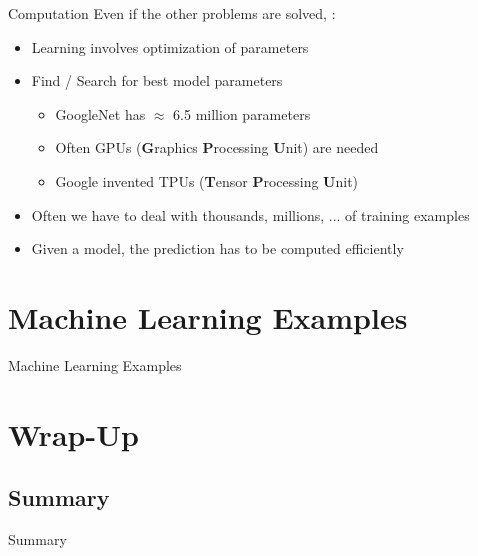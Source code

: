 \begin{frame}{Computation}{}
	Even if the other problems are solved, :
	\begin{itemize}
		\item Learning involves optimization of parameters
		\item Find / Search for best model parameters
		\begin{itemize}
			\item GoogleNet has $\approx$ 6.5 million parameters
			\item Often GPUs (\textbf{G}raphics \textbf{P}rocessing \textbf{U}nit) are needed
			\item Google invented TPUs (\textbf{T}ensor \textbf{P}rocessing \textbf{U}nit)
		\end{itemize}
		\item Often we have to deal with thousands, millions, ... of training examples
		\item Given a model, the prediction has to be computed efficiently
	\end{itemize}
\end{frame}


\section{Machine Learning Examples}

\begin{frame}{Machine Learning Examples}{}

\end{frame}


\section{Wrap-Up}

\subsection{Summary}

\begin{frame}{Summary}{}

\end{frame}


